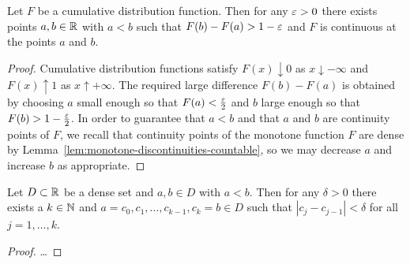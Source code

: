 \begin{lemma}
  \label{lem:cdf-tight}
  Let $F$ be a cumulative distribution function. Then for any
  $\varepsilon > 0$ there exists points $a,b \in \mathbb{R}$ with $a < b$ such that
  $F(b) - F(a) > 1 - \varepsilon$ and $F$ is continuous at the points $a$ and $b$.
\end{lemma}
\begin{proof}
  Cumulative distribution functions satisfy
  $F(x) \downarrow 0$ as $x \downarrow - \infty$ and
  $F(x) \uparrow 1$ as $x \uparrow + \infty$. The
  required large difference $F(b) - F(a)$ is
  obtained by choosing $a$ small enough so that $F(a) < \frac{\varepsilon}{2}$
  and $b$ large enough so that $F(b) > 1 - \frac{\varepsilon}{2}$.
  In order to guarantee that $a < b$ and
  that $a$ and $b$ are continuity points of $F$, we
  recall that continuity points of the monotone function $F$ are dense
  by Lemma~\ref{lem:monotone-discontinuities-countable}, so we
  may decrease $a$ and increase $b$ as appropriate.
\end{proof}

\begin{lemma}
  \label{lem:subdivision-dense}
  Let $D \subset \mathbb{R}$ be a dense set and $a,b \in D$ with $a < b$.
  Then for any $\delta > 0$ there exists a $k \in \mathbb{N}$
  and $a = c_0, c_1, \ldots, c_{k-1}, c_k = b \in D$ such that
  $|c_j - c_{j-1}| < \delta$ for all $j=1,\ldots,k$.
\end{lemma}
\begin{proof}
  \ldots
\end{proof}

